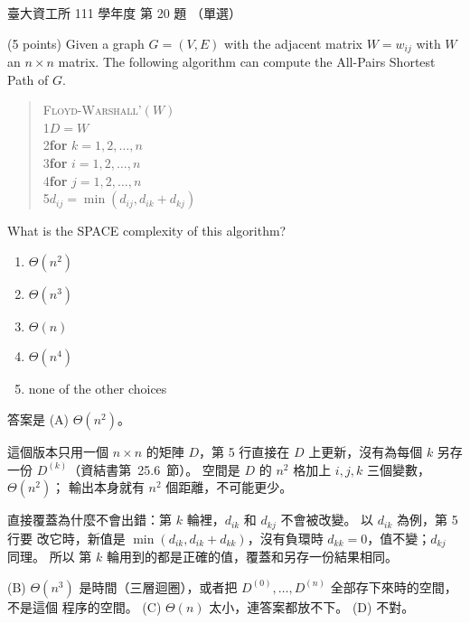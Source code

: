 \begin{pastexam}[label={px:ntu-111-dsaa-20}]{臺大資工所 111 學年度 第 20 題}
（單選）

(5 points) Given a graph $G=(V,E)$ with the adjacent matrix $W=w_{ij}$ with $W$ an $n\times n$
matrix. The following algorithm can compute the All-Pairs Shortest Path of $G$.

\begin{quote}
\textsc{Floyd-Warshall'}$(W)$\\
1\quad $D=W$\\
2\quad \textbf{for} $k=1,2,\ldots,n$\\
3\quad\quad \textbf{for} $i=1,2,\ldots,n$\\
4\quad\quad\quad \textbf{for} $j=1,2,\ldots,n$\\
5\quad\quad\quad\quad $d_{ij}=\min(d_{ij},d_{ik}+d_{kj})$
\end{quote}
What is the SPACE complexity of this algorithm?
\begin{enumerate}[label=(\Alph*)]
\item $\Theta(n^2)$
\item $\Theta(n^3)$
\item $\Theta(n)$
\item $\Theta(n^4)$
\item none of the other choices
\end{enumerate}
\end{pastexam}

\begin{pastsoln}
答案是 (A) $\Theta(n^2)$。

這個版本只用一個 $n \times n$ 的矩陣 $D$，第 5 行直接在 $D$ 上更新，沒有為每個 $k$ 另存一份
$D^{(k)}$（資結書第~25.6~節）。 空間是 $D$ 的 $n^2$ 格加上 $i, j, k$ 三個變數，$\Theta(n^2)$；
輸出本身就有 $n^2$ 個距離，不可能更少。

直接覆蓋為什麼不會出錯：第 $k$ 輪裡，$d_{ik}$ 和 $d_{kj}$ 不會被改變。 以 $d_{ik}$ 為例，第 5 行要
改它時，新值是 $\min(d_{ik}, d_{ik} + d_{kk})$，沒有負環時 $d_{kk} = 0$，值不變；$d_{kj}$ 同理。 所以
第 $k$ 輪用到的都是正確的值，覆蓋和另存一份結果相同。

(B) $\Theta(n^3)$ 是時間（三層迴圈），或者把 $D^{(0)}, \ldots, D^{(n)}$ 全部存下來時的空間，不是這個
程序的空間。 (C) $\Theta(n)$ 太小，連答案都放不下。 (D) 不對。
\end{pastsoln}
